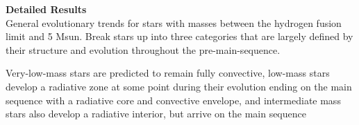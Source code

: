 \textbf{Detailed Results} \\
General evolutionary trends for stars with masses between the hydrogen fusion limit and 5 Msun. Break stars up into three categories that are largely defined by their structure and evolution throughout the pre-main-sequence. 
\begin{itemize}
 
Very-low-mass stars are predicted to remain fully convective, 
low-mass stars develop a radiative zone at some point during their evolution ending on the main sequence with a radiative core and convective envelope, and intermediate mass stars also develop a radiative interior, but arrive on the main sequence
\end{itemize}